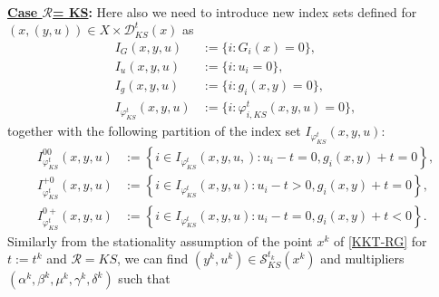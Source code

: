 ${}$\\
\noindent \textbf{\underline{Case $ \mathcal{R}$= KS}:} Here also we need to introduce new index sets defined for
$(x,(y,u))\in X\times\mathcal{D}_{KS}^{t}(x)$ as
\begin{align*}
I_{G}(x,y,u)  & :=\{i: G_{i}(x)=0\},\\
I_{u}(x,y,u)  & :=\{i: u_{i}=0\},\\
I_{g}(x,y,u)  & :=\{i: g_{i}(x,y)=0\},\\
I_{\varphi^{t}_{KS}}(x,y,u)  & :=\{i: \varphi^{t}_{i,KS}(x,y,u)=0\},
\end{align*}
together with the following partition of the index set $I_{\varphi^{t}_{KS}}(x,y,u)$: 
\begin{align*}
I_{\varphi^{t}_{KS}}^{00}(x,y,u)  & :=\left\{i\in I_{\varphi^{t}_{KS}}(x,y,u,): u_{i}-t=0,\text{
}g_{i}(x,y)+t=0\right\},\\
I_{\varphi^{t}_{KS}}^{+0}(x,y,u)  & :=\left\{i\in I_{\varphi^{t}_{KS}}(x,y,u): u_{i}-t>0,\text{
}g_{i}(x,y)+t=0\right\},\\
I_{\varphi^{t}_{KS}}^{0+}(x,y,u)  & :=\left\{i\in I_{\varphi^{t}_{KS}}(x,y,u): u_{i}-t=0,\text{
}g_{i}(x,y)+t<0\right\}.
\end{align*}
       	Similarly from the stationality assumption of the point $x^{k}$ of \eqref{KKT-RG} for $t:=t^k$ and $\mathcal{R}=KS$,
       	we can find $(y^{k},u^{k})\in\mathcal{S}_{KS}^{t_{k}}(x^{k})$ and
       	multipliers $(\alpha^{k},\beta^{k},\mu^{k},\gamma^{k},\delta^{k})$ such that
